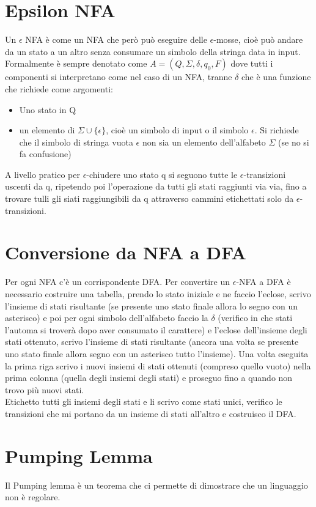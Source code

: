 \section{Epsilon NFA}
Un $\epsilon$ NFA è come un NFA che però può eseguire delle $\epsilon$-mosse,
cioè può andare da un stato a un altro senza consumare un simbolo della stringa
data in input.
Formalmente è sempre denotato come $A = (Q, \Sigma, \delta, q_0, F)$ dove tutti 
i componenti si interpretano come nel caso di un NFA, tranne $\delta$ che è una funzione
che richiede come argomenti:
\begin{itemize}
    \item Uno stato in Q
    \item un elemento di $\Sigma \cup \{\epsilon\}$, cioè un simbolo di input o il
    simbolo $\epsilon$. Si richiede che il simbolo di stringa vuota $\epsilon$ non sia
    un elemento dell'alfabeto $\Sigma$ (se no si fa confusione)
\end{itemize}

A livello pratico per $\epsilon$-chiudere uno
stato q si seguono tutte le $\epsilon$-transizioni uscenti da q, ripetendo poi l'operazione da tutti gli
stati raggiunti via via, fino a trovare tulli gli siati raggiungibili da q attraverso cammini
etichettati solo da $\epsilon$-transizioni.

\section{Conversione da NFA a DFA}
Per ogni NFA c'è un corrispondente DFA.
Per convertire un $\epsilon$-NFA a DFA è necessario costruire una tabella, 
prendo lo stato iniziale e ne faccio l'eclose, scrivo l'insieme di stati risultante (se presente
uno stato finale allora lo segno con un asterisco) e poi per ogni simbolo dell'alfabeto
faccio la $\delta$ (verifico in che stati l'automa si troverà dopo aver consumato il carattere) 
e l'eclose dell'insieme degli stati ottenuto, scrivo l'insieme di stati risultante 
(ancora una volta se presente uno stato finale allora segno con un asterisco tutto l'insieme).
Una volta eseguita la prima riga scrivo i nuovi insiemi di stati ottenuti (compreso quello vuoto)
nella prima colonna (quella degli insiemi degli stati) e proseguo fino a quando non trovo più nuovi
stati.
\\ Etichetto tutti gli insiemi degli stati e li scrivo come stati unici, verifico le transizioni che
mi portano da un insieme di stati all'altro e costruisco il DFA.
\section{Pumping Lemma}
Il Pumping lemma è un teorema che ci permette di dimostrare che un linguaggio non è regolare.
